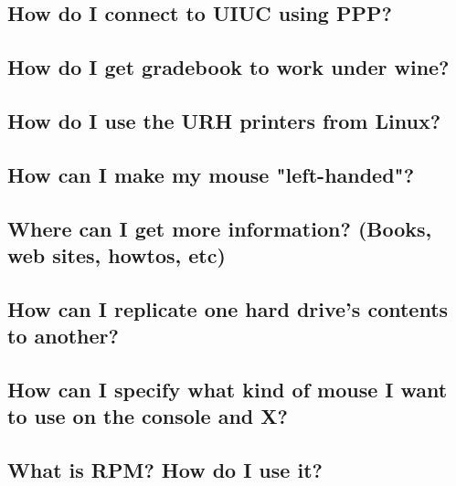 \documentclass[a4paper]{article}
\begin{document}
\subsection{How do I connect to UIUC using PPP?}






\subsection{How do I get gradebook to work under wine?}






\subsection{How do I use the URH printers from Linux?}






\subsection{How can I make my mouse "left-handed"?}






\subsection{Where can I get more information? (Books, web sites, howtos, etc)}






\subsection{How can I replicate one hard drive's contents to another?}






\subsection{How can I specify what kind of mouse I want to use on the console and X?}






\subsection{What is RPM?  How do I use it?}
\end{document}

